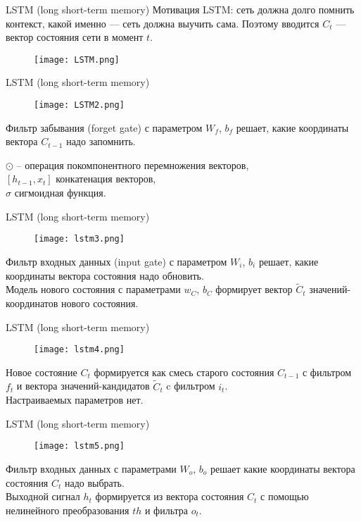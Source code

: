 \documentclass[11pt]{beamer}
\begin{document}
 \begin{frame}{LSTM (long short-term memory)}
 Мотивация LSTM: сеть должна долго помнить контекст, какой именно —
сеть должна выучить сама. Поэтому вводится $C_t$ — вектор состояния сети
в момент $t$.
      \begin{figure}
	        \centering
	        \texttt{[image: LSTM.png]}
	        
	    \end{figure}
 \end{frame}
 \begin{frame}{LSTM (long short-term memory)}
 \begin{figure}
	        \centering
	        \texttt{[image: LSTM2.png]}
	        
	    \end{figure}


Фильтр забывания (forget gate) с параметром $W_f$, $b_f$ решает,
какие координаты вектора $C_{t−1}$ надо запомнить.

$\odot$ -- операция покомпонентного перемножения векторов,\\$[h_{t-1},x_t]$ конкатенация векторов,\\
$\sigma$ сигмоидная функция.
 \end{frame}
 \begin{frame}{LSTM (long short-term memory)}
      \begin{figure}
	        \centering
	        \texttt{[image: lstm3.png]}
	        
	    \end{figure}
     Фильтр входных данных (input gate) с параметром $W_i$, $b_i$ решает,
какие координаты вектора состояния надо обновить.\\
Модель нового состояния с параметрами $w_C$, $b_C$ формирует вектор $\widetilde{C}_t$ значений-координатов нового состояния.
 \end{frame}
 \begin{frame}{LSTM (long short-term memory)}
      \begin{figure}
	        \centering
	        \texttt{[image: lstm4.png]}
	        
	    \end{figure}
    Новое состояние $C_t$ формируется как смесь старого состояния $C_{t-1}$ с фильтром $f_t$ и вектора значений-кандидатов $\widetilde{C}_t$ c фильтром $i_t$.\\
    Настраиваемых параметров нет.
 \end{frame}
 \begin{frame}{LSTM (long short-term memory)}
      \begin{figure}
	        \centering
	        \texttt{[image: lstm5.png]}
	        
	    \end{figure}
     Фильтр входных данных с параметрами $W_o$, $b_o$ решает какие координаты вектора состояния $C_t$ надо выбрать.\\
     Выходной сигнал $h_t$ формируется из вектора состояния $C_t$ с помощью нелинейного преобразования $th$ и фильтра $o_t$.
 \end{frame}
\end{document}
